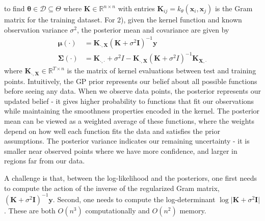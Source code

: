 to find $\boldsymbol{\theta}\in \mathcal{D}\subseteq \Theta$ where $\textbf{K}\in \mathbb{R}^{n\times n}$ with entries $\textbf{K}_{ij}=k_\theta(\textbf{x}_i,\textbf{x}_j)$ is the Gram matrix for the training dataset. For 2), given the kernel function and known observation variance $\sigma^2$, the posterior mean and covariance are given by
\begin{align}
\boldsymbol{\mu}(\cdot) &= \mathbf{K}_{\cdot, \mathbf{X}}\left(\mathbf{K}+\sigma^{2} \mathbf{I}\right)^{-1} \mathbf{y}\label{eqn:posterior-mean}\\
\boldsymbol{\Sigma}(\cdot) &= \textbf{K}_{\cdot,\cdot}+\sigma^2I-\textbf{K}_{\cdot,\textbf{X}} (\textbf{K}+\sigma^2 I)^{-1}\textbf{K}_{\textbf{X},\cdot}\label{eqn:posterior-covariance}
\end{align}
where $\textbf{K}_{\cdot,\textbf{X}}\in \mathbb{R}^{T\times n}$ is the matrix of kernel evaluations between test and training points. Intuitively, the GP prior represents our belief about all possible functions before seeing any data. When we observe data points, the posterior represents our updated belief - it gives higher probability to functions that fit our observations while maintaining the smoothness properties encoded in the kernel. The posterior mean can be viewed as a weighted average of these functions, where the weights depend on how well each function fits the data and satisfies the prior assumptions. The posterior variance indicates our remaining uncertainty - it is smaller near observed points where we have more confidence, and larger in regions far from our data.

A challenge is that, between the log-likelihood and the posteriors, one first needs to compute the action of the inverse of the regularized Gram matrix, $(\textbf{K}+\sigma^2 \textbf{I})^{-1}\textbf{y}$. Second, one needs to compute the log-determinant $\log \vert \textbf{K}+\sigma^2 \textbf{I}\vert$. These are both $O(n^3)$ computationally and $O(n^2)$ memory.

